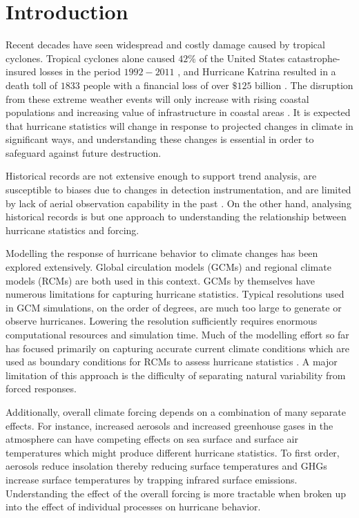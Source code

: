 \section{Introduction}
\label{intro}
\par
Recent decades have seen widespread and costly damage caused by tropical cyclones. Tropical cyclones alone caused $42\%$ of the United States catastrophe-insured losses in the period $1992-2011$ \cite{tc_reanal:1}, and Hurricane Katrina resulted in a death toll of $1833$ people with a financial loss of over $\$125$ billion \cite{tc_reanal:1}. The disruption from these extreme weather events will only increase with rising coastal populations and increasing value of infrastructure in coastal areas \cite{kerry_tc_clim}. It is expected that hurricane statistics will change in response to projected changes in climate in significant ways, and understanding these changes is essential in order to safeguard against future destruction. 
\par
Historical records are not extensive enough to support trend analysis, are susceptible to biases due to changes in detection instrumentation, and are limited by lack of aerial observation capability in the past \cite{kerry_clivar}. On the other hand, analysing historical records is but one approach to understanding the relationship between hurricane statistics and forcing. 
\par
Modelling the response of hurricane behavior to climate changes has been explored extensively. Global circulation models (GCMs) and regional climate models (RCMs) are both used in this context. GCMs by themselves have numerous limitations for capturing hurricane statistics. Typical resolutions used in GCM simulations, on the order of degrees, are much too large to generate or observe hurricanes. Lowering the resolution sufficiently requires enormous computational resources and simulation time. Much of the modelling effort so far has focused primarily on capturing accurate current climate conditions which are used as boundary conditions for RCMs to assess hurricane statistics \cite{kerry_clivar}. A major limitation of this approach is the difficulty of separating natural variability from forced responses.
\par
Additionally, overall climate forcing depends on a combination of many separate effects. For instance, increased aerosols and increased greenhouse gases in the atmosphere can have competing effects on sea surface and surface air temperatures which might produce different hurricane statistics. To first order, aerosols reduce insolation thereby reducing surface temperatures and GHGs increase surface temperatures by trapping infrared surface emissions. Understanding the effect of the overall forcing is more tractable when broken up into the effect of individual processes on hurricane behavior. 
